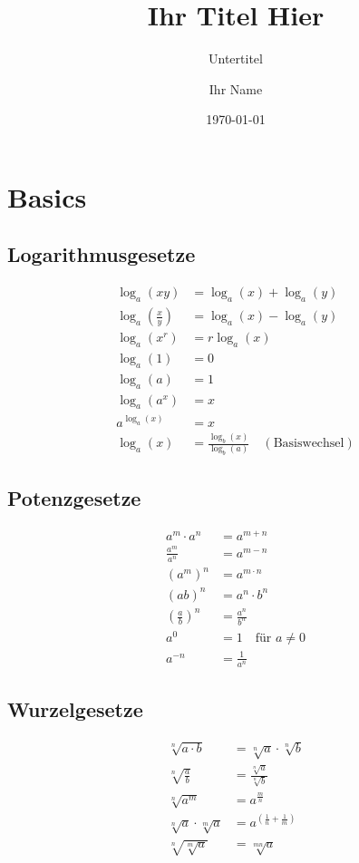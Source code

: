 \documentclass[a4paper,10pt]{article}
\title{Ihr Titel Hier}
\subtitle{Untertitel}
\author{Ihr Name}
\date{\today}
\begin{document}
\section{Basics}

\begin{multicols}{3}

\subsection{Logarithmusgesetze}

\begin{align*}
    \log_a(xy) &= \log_a(x) + \log_a(y) \\
    \log_a\left(\frac{x}{y}\right) &= \log_a(x) - \log_a(y) \\
    \log_a(x^r) &= r \log_a(x) \\
    \log_a(1) &= 0 \\
    \log_a(a) &= 1 \\
    \log_a(a^x) &= x \\
    a^{\log_a(x)} &= x \\
    \log_a(x) &= \frac{\log_b(x)}{\log_b(a)} \quad (\text{Basiswechsel})
\end{align*}

\subsection{Potenzgesetze}

\begin{align*}
    a^m \cdot a^n &= a^{m+n} \\
    \frac{a^m}{a^n} &= a^{m-n} \\
    (a^m)^n &= a^{m \cdot n} \\
    (ab)^n &= a^n \cdot b^n \\
    \left(\frac{a}{b}\right)^n &= \frac{a^n}{b^n} \\
    a^0 &= 1 \quad \text{für } a \neq 0 \\
    a^{-n} &= \frac{1}{a^n}
\end{align*}

\subsection{Wurzelgesetze}

\begin{align*}
    \sqrt[n]{a \cdot b} &= \sqrt[n]{a} \cdot \sqrt[n]{b} \\
    \sqrt[n]{\frac{a}{b}} &= \frac{\sqrt[n]{a}}{\sqrt[n]{b}} \\
    \sqrt[n]{a^m} &= a^{\frac{m}{n}} \\
    \sqrt[n]{a} \cdot \sqrt[m]{a} &= a^{\left(\frac{1}{n} + \frac{1}{m}\right)} \\
    \sqrt[n]{\sqrt[m]{a}} &= \sqrt[mn]{a}
\end{align*}


\end{multicols}
\end{document}
